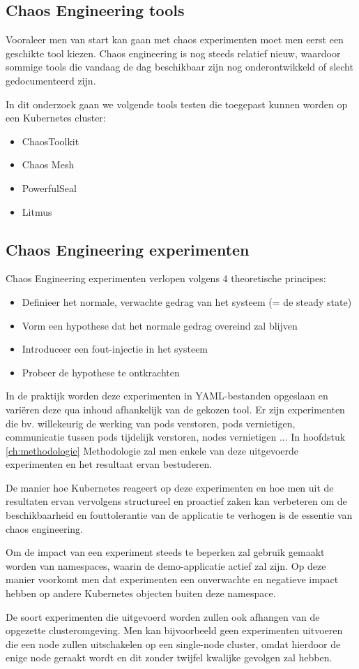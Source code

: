 \subsection{Chaos Engineering tools}

Vooraleer men van start kan gaan met chaos experimenten moet men eerst een geschikte tool kiezen. Chaos engineering is nog steeds relatief nieuw, waardoor sommige tools die vandaag de dag beschikbaar zijn nog onderontwikkeld of slecht gedocumenteerd zijn.

In dit onderzoek gaan we volgende tools testen die toegepast kunnen worden op een Kubernetes cluster: 
\begin{itemize}
    \item ChaosToolkit
    \item Chaos Mesh
    \item PowerfulSeal 
    \item Litmus
\end{itemize} 

\subsection{Chaos Engineering experimenten}

Chaos Engineering experimenten verlopen volgens 4 theoretische principes: 
\begin{itemize}
    \item Definieer het normale, verwachte gedrag van het systeem (= de steady state)
    \item Vorm een hypothese dat het normale gedrag overeind zal blijven 
    \item Introduceer een fout-injectie in het systeem
    \item Probeer de hypothese te ontkrachten
\end{itemize}

In de praktijk worden deze experimenten in YAML-bestanden opgeslaan en variëren deze qua inhoud afhankelijk van de gekozen tool. Er zijn experimenten die bv. willekeurig de werking van pods verstoren, pods vernietigen, communicatie tussen pods tijdelijk verstoren, nodes vernietigen ... In hoofdstuk \ref{ch:methodologie} Methodologie zal men enkele van deze uitgevoerde experimenten en het resultaat ervan bestuderen. 

De manier hoe Kubernetes reageert op deze experimenten en hoe men uit de resultaten ervan vervolgens structureel en proactief zaken kan verbeteren om de beschikbaarheid en fouttolerantie van de applicatie te verhogen is de essentie van chaos engineering.   

Om de impact van een experiment steeds te beperken zal gebruik gemaakt worden van namespaces, waarin de demo-applicatie actief zal zijn. Op deze manier voorkomt men dat experimenten een onverwachte en negatieve impact hebben op andere Kubernetes objecten buiten deze namespace.

De soort experimenten die uitgevoerd worden zullen ook afhangen van de opgezette clusteromgeving. Men kan bijvoorbeeld geen experimenten uitvoeren die een node zullen uitschakelen op een single-node cluster, omdat hierdoor de enige node geraakt wordt en dit zonder twijfel kwalijke gevolgen zal hebben.    
